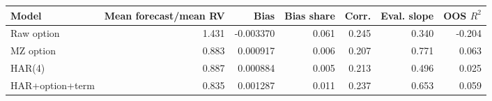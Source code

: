 \begin{tabular}{lrrrrrr}
\toprule
Model & Mean forecast/mean RV & Bias & Bias share & Corr. & Eval. slope & OOS $R^2$ \\
\midrule
Raw option & 1.431 & -0.003370 & 0.061 & 0.245 & 0.340 & -0.204 \\
MZ option & 0.883 & 0.000917 & 0.006 & 0.207 & 0.771 & 0.063 \\
HAR(4) & 0.887 & 0.000884 & 0.005 & 0.213 & 0.496 & 0.025 \\
HAR+option+term & 0.835 & 0.001287 & 0.011 & 0.237 & 0.653 & 0.059 \\
\bottomrule
\end{tabular}
